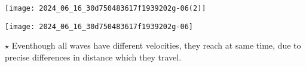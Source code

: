 \begin{minipage}[t][][b]{.67\textwidth}%
	\begin{center}
		\texttt{[image: 2024\_06\_16\_30d750483617f1939202g-06(2)]}
	\end{center}
\end{minipage}


\texttt{[image: 2024\_06\_16\_30d750483617f1939202g-06]}

$\star$ Eventhough all waves have different velocities, they reach at same time, due to precise differences in distance which they travel.
